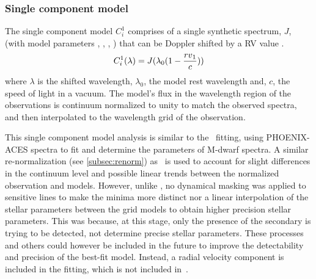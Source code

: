 \subsubsection{Single component model}
\label{subsubsec:single-model}
The single component model \(C^{1}_{i}\) comprises of a single synthetic spectrum, \(J\), (with model parameters \Teff{}, \logg{}, \feh{}, \alphafe{}) \alphafe{} that can be Doppler shifted by a {RV} value \Rvone{}.
\begin{equation}
C^{1}_{i}(\lambda) = J{}(\lambda_{0}(1-\frac{{rv{}}_{1}}{c}))
\end{equation}
where \(\lambda\) is the shifted wavelength, \(\lambda_{0}\), the model rest wavelength and, \(c\), the speed of light in a vacuum.
The model's flux in the wavelength region of the observations is continuum normalized to unity to match the observed spectra, and then interpolated to the wavelength grid of the observation.

This single component model analysis is similar to the~\citet{passegger_fundamental_2016} \textchisquared{} fitting, using {PHOENIX-ACES} spectra to fit and determine the parameters of M-dwarf spectra.
A similar re-normalization (see \cref{subsec:renorm}) as~\citet{passegger_fundamental_2016} is used to account for slight differences in the continuum level and possible linear trends between the normalized observation and models.
However, unlike \citet{passegger_fundamental_2016}, no dynamical masking was applied to sensitive lines to make the \textchisquared{} minima more distinct nor a linear interpolation of the stellar parameters between the grid models to obtain higher precision stellar parameters.
This was because, at this stage, only the presence of the secondary is trying to be detected, not determine precise stellar parameters.
These processes and others could however be included in the future to improve the detectability and precision of the best-fit model.
Instead, a radial velocity component is included in the \textchisquared{} fitting, which is not included in~\citet{passegger_fundamental_2016}.


